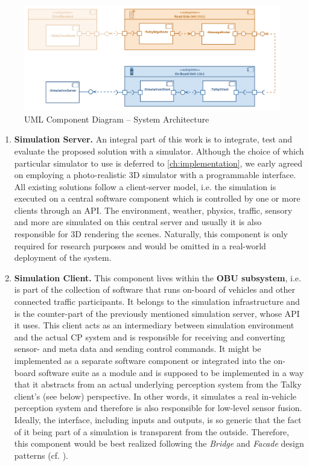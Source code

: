 \begin{figure}
	\centering
	\includegraphics[width=1\linewidth]{98_images/components_plain}
	\caption{UML Component Diagram – System Architecture}
	\label{fig:components_plain}
\end{figure}

\begin{enumerate}[C1: ]
	\item \textbf{Simulation Server.} An integral part of this work is to integrate, test and evaluate the proposed solution with a simulator. Although the choice of which particular simulator to use is deferred to \autoref{ch:implementation}, we early agreed on employing a photo-realistic 3D simulator with a programmable interface. All existing solutions follow a client-server model, i.e. the simulation is executed on a central software component which is controlled by one or more clients through an API. The environment, weather, physics, traffic, sensory and more are simulated on this central server and usually it is also responsible for 3D rendering the scenes. Naturally, this component is only required for research purposes and would be omitted in a real-world deployment of the system.
	\item \textbf{Simulation Client.} This component lives within the \textbf{OBU subsystem}, i.e. is part of the collection of software that runs on-board of vehicles and other connected traffic participants. It belongs to the simulation infrastructure and is the counter-part of the previously mentioned simulation server, whose API it uses. This client acts as an intermediary between simulation environment and the actual CP system and is responsible for receiving and converting sensor- and meta data and sending control commands. It might be implemented as a separate software component or integrated into the on-board software suite as a module and is supposed to be implemented in a way that it abstracts from an actual underlying perception system from the Talky client's (see below) perspective. In other words, it simulates a real in-vehicle perception system and therefore is also responsible for low-level sensor fusion. Ideally, the interface, including inputs and outputs, is so generic that the fact of it being part of a simulation is transparent from the outside. Therefore, this component would be best realized following the \textit{Bridge} and \textit{Facade} design patterns (cf. \cite{EricFreemanElisabethFreemanBertBates2013}).

\end{enumerate}
